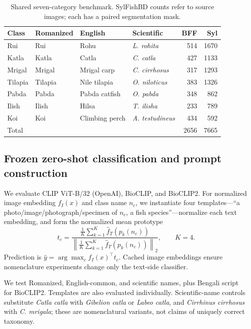 \documentclass{article}
\begin{document}
\begin{table}[t]
\caption{Shared seven-category benchmark. SylFishBD counts refer to source images; each has a paired segmentation mask.}
\label{tab:data}
\centering
\small
\begin{tabular}{l l l l rr}
\toprule
Class & Romanized & English & Scientific & BFF & Syl \\
\midrule
Rui & Rui & Rohu & \emph{L. rohita} & 514 & 1670 \\
Katla & Katla & Catla & \emph{C. catla} & 427 & 1133 \\
Mrigal & Mrigal & Mrigal carp & \emph{C. cirrhosus} & 317 & 1293 \\
Tilapia & Tilapia & Nile tilapia & \emph{O. niloticus} & 383 & 1326 \\
Pabda & Pabda & Pabda catfish & \emph{O. pabda} & 348 & 862 \\
Ilish & Ilish & Hilsa & \emph{T. ilisha} & 233 & 789 \\
Koi & Koi & Climbing perch & \emph{A. testudineus} & 434 & 592 \\
\midrule
Total &&&& 2656 & 7665 \\
\bottomrule
\end{tabular}
\end{table}

\subsection{Frozen zero-shot classification and prompt construction}
We evaluate CLIP ViT-B/32 (OpenAI), BioCLIP, and BioCLIP2. For normalized image embedding $f_I(x)$ and class name $n_c$, we instantiate four templates---``a photo/image/photograph/specimen of $n_c$, a fish species''---normalize each text embedding, and form the normalized mean prototype
\begin{equation}
 t_c = \frac{\frac{1}{K}\sum_{k=1}^K \hat f_T(p_k(n_c))}{\left\|\frac{1}{K}\sum_{k=1}^K \hat f_T(p_k(n_c))\right\|_2}, \qquad K=4.
\end{equation}
Prediction is $\hat y=\arg\max_c f_I(x)^\top t_c$. Cached image embeddings ensure nomenclature experiments change only the text-side classifier.

We test Romanized, English-common, and scientific names, plus Bengali script for BioCLIP2. Templates are also evaluated individually. Scientific-name controls substitute \emph{Catla catla} with \emph{Gibelion catla} or \emph{Labeo catla}, and \emph{Cirrhinus cirrhosus} with \emph{C. mrigala}; these are nomenclatural variants, not claims of uniquely correct taxonomy.
\end{document}
